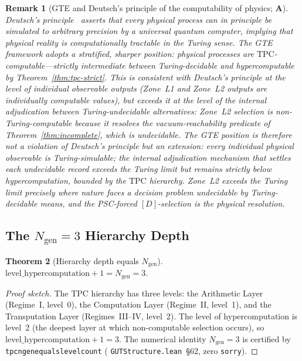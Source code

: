 \documentclass[12pt,letterpaper]{article}
\newtheorem{theorem}{Theorem}[section]
\newtheorem{remark}[theorem]{Remark}
\newcommand{\TPC}{\mathrm{TPC}}
\newcommand{\ngen}{N_{\mathrm{gen}}}
\newcommand{\catA}{\textbf{A}}
\newcommand{\lean}[1]{%
  \penalty-100
  \begingroup\def\_{\textunderscore\allowbreak}\texttt{#1}\endgroup}
\begin{document}
\begin{remark}[GTE and Deutsch's principle of the computability of physics; $\catA$]
\label{rem:deutsch-principle}
Deutsch's principle~\cite{Deutsch1985QTT} asserts that every physical process can in
principle be simulated to arbitrary precision by a universal quantum computer, implying
that physical reality is computationally tractable in the Turing sense.
The GTE framework adopts a stratified, sharper position: physical processes are
$\TPC$-computable---strictly intermediate between Turing-decidable and
hypercomputable by Theorem~\ref{thm:tpc-strict}.
This is consistent with Deutsch's principle at the level of individual observable
outputs (Zone~L1 and Zone~L2 outputs are individually computable values), but exceeds
it at the level of the internal adjudication between Turing-undecidable alternatives:
Zone~L2 selection is non-Turing-computable because it resolves the vacuum-reachability
predicate of Theorem~\ref{thm:incomplete}, which is undecidable.
The GTE position is therefore not a violation of Deutsch's principle but an extension:
every individual physical observable is Turing-simulable; the internal adjudication
mechanism that settles each undecidable record exceeds the Turing limit but remains
strictly below hypercomputation, bounded by the $\TPC$ hierarchy.
Zone~L2 exceeds the Turing limit precisely where nature faces a decision problem
undecidable by Turing-decidable means, and the PSC-forced $[D]$-selection is the
physical resolution.
\end{remark}

\subsection{The \texorpdfstring{$N_{\mathrm{gen}} = 3$}{N\_gen=3} Hierarchy Depth}
\label{sec:tpc-ngen}

\begin{theorem}[Hierarchy depth equals \texorpdfstring{$\ngen$}{N\_gen}]
\label{thm:ngen-depth}
$\mathrm{level\_hypercomputation} + 1 = \ngen = 3$.
\end{theorem}

\begin{proof}[Proof sketch]
The TPC hierarchy has three levels: the Arithmetic Layer (Regime~I, level~0),
the Computation Layer (Regime~II, level~1), and the Transputation Layer
(Regimes~III--IV, level~2).  The level of hypercomputation is level~2 (the
deepest layer at which non-computable selection occurs), so
$\mathrm{level\_hypercomputation} + 1 = 3$.  The numerical identity $\ngen = 3$
is certified by \lean{tpc\_ngen\_equals\_level\_count}
(\lean{GUTStructure.lean}~\S62, zero \texttt{sorry}).
\end{proof}
\end{document}
